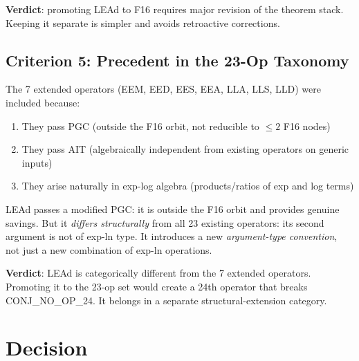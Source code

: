 \documentclass[11pt]{article}
\begin{document}
\textbf{Verdict}: promoting LEAd to F16 requires major revision of the theorem stack.
Keeping it separate is simpler and avoids retroactive corrections.

\subsection{Criterion 5: Precedent in the 23-Op Taxonomy}

The 7 extended operators (EEM, EED, EES, EEA, LLA, LLS, LLD) were included because:
\begin{enumerate}
  \item They pass PGC (outside the F16 orbit, not reducible to $\leq 2$ F16 nodes)
  \item They pass AIT (algebraically independent from existing operators on generic inputs)
  \item They arise naturally in exp-log algebra (products/ratios of exp and log terms)
\end{enumerate}

LEAd passes a modified PGC: it is outside the F16 orbit and provides genuine savings.
But it \emph{differs structurally} from all 23 existing operators: its second argument
is not of exp-ln type. It introduces a new \emph{argument-type convention}, not
just a new combination of exp-ln operations.

\textbf{Verdict}: LEAd is categorically different from the 7 extended operators.
Promoting it to the 23-op set would create a 24th operator that breaks CONJ\_NO\_OP\_24.
It belongs in a separate structural-extension category.

\section{Decision}
\end{document}
